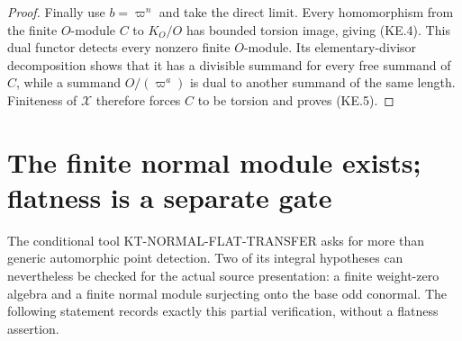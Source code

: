 \documentclass[11pt,a4paper]{article}
\theoremstyle{definition}
\begin{document}
\begin{proof}
Finally use $b=\varpi^n$ and take the direct limit.
Every homomorphism from the finite $O$-module $C$ to
$K_O/O$ has bounded torsion image, giving (KE.4).
This dual functor detects every nonzero finite
$O$-module.  Its elementary-divisor decomposition
shows that it has a divisible summand for every free
summand of $C$, while a summand $O/(\varpi^a)$ is
dual to another summand of the same length.  Finiteness
of $\mathcal X$ therefore forces $C$ to be torsion
and proves (KE.5).
\end{proof}



\section{The finite normal module exists; flatness is a separate gate}
\label{sec:kt-projector-flatness}

The conditional tool KT-NORMAL-FLAT-TRANSFER asks for more
than generic automorphic point detection.  Two of its
integral hypotheses can nevertheless be checked for the
actual source presentation: a finite weight-zero algebra
and a finite normal module surjecting onto the base odd
conormal.  The following statement records exactly this
partial verification, without a flatness assertion.
\end{document}
